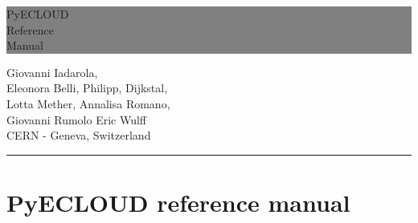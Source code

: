 \documentclass[a4paper,12pt]{article}
\newcommand{\HRule}[1]{\hfill \rule{0.2\linewidth}{#1}}
\begin{document}
\thispagestyle{empty} %


\colorbox{Gray}{
	\parbox[t]{1.0\linewidth}{
		\centering \fontsize{50pt}{80pt}\selectfont %
		\vspace*{0.7cm} %

		\hfill PyECLOUD \\
		\hfill Reference \\
		\hfill Manual\par

		\vspace*{0.7cm} %
	}
}


\vfill %


{\centering \large
\hfill Giovanni Iadarola, \\
\hfill Eleonora Belli, Philipp, Dijkstal,\\
\hfill Lotta Mether, Annalisa Romano,\\
\hfill Giovanni Rumolo Eric Wulff\\
\hfill CERN - Geneva, Switzerland

\HRule{1pt}} %


\clearpage %

\newpage

\section*{PyECLOUD reference manual}
\end{document}
